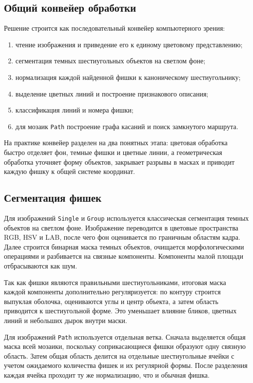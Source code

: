 \documentclass[12pt,a4paper]{article}
\begin{document}
\subsection{Общий конвейер обработки}
Решение строится как последовательный конвейер компьютерного зрения:
\begin{enumerate}[leftmargin=1.2cm]
    \item чтение изображения и приведение его к единому цветовому представлению;
    \item сегментация темных шестиугольных объектов на светлом фоне;
    \item нормализация каждой найденной фишки к каноническому шестиугольнику;
    \item выделение цветных линий и построение признакового описания;
    \item классификация линий и номера фишки;
    \item для мозаик \texttt{Path} построение графа касаний и поиск замкнутого маршрута.
\end{enumerate}

На практике конвейер разделен на два понятных этапа: цветовая обработка быстро отделяет фон, темные фишки и цветные линии, а геометрическая обработка уточняет форму объектов, закрывает разрывы в масках и приводит каждую фишку к общей системе координат.

\subsection{Сегментация фишек}
Для изображений \texttt{Single} и \texttt{Group} используется классическая сегментация темных объектов на светлом фоне. Изображение переводится в цветовые пространства RGB, HSV и LAB, после чего фон оценивается по граничным областям кадра. Далее строится бинарная маска темных объектов, очищается морфологическими операциями и разбивается на связные компоненты. Компоненты малой площади отбрасываются как шум.

Так как фишки являются правильными шестиугольниками, итоговая маска каждой компоненты дополнительно регуляризуется: по контуру строится выпуклая оболочка, оцениваются углы и центр объекта, а затем область приводится к шестиугольной форме. Это уменьшает влияние бликов, цветных линий и небольших дырок внутри маски.

Для изображений \texttt{Path} используется отдельная ветка. Сначала выделяется общая маска всей мозаики, поскольку соприкасающиеся фишки образуют одну связную область. Затем общая область делится на отдельные шестиугольные ячейки с учетом ожидаемого количества фишек и их регулярной формы. После разделения каждая ячейка проходит ту же нормализацию, что и обычная фишка.
\end{document}
